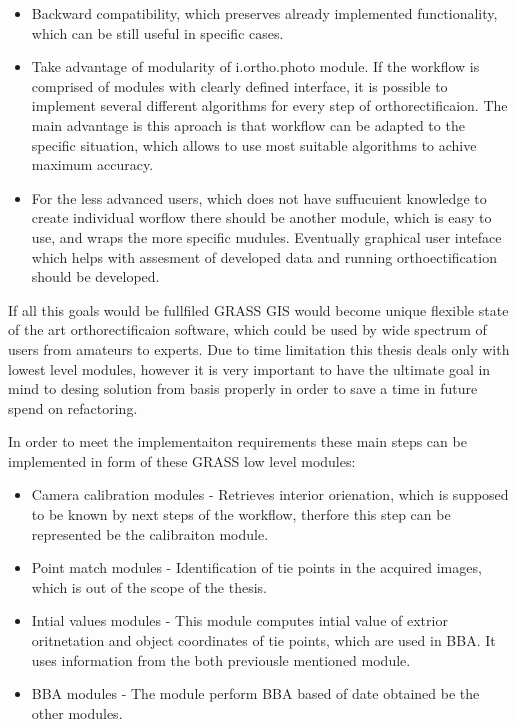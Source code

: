 \documentclass[a4paper,12pt]{report}
\begin{document}
\begin{itemize}
\begin{itemize}
\item Backward compatibility, which preserves already implemented functionality, which
can be still useful in specific cases. 
\item Take advantage of modularity of i.ortho.photo module.
If the workflow is comprised of modules with clearly defined interface, it is possible to implement
several different algorithms for every step of orthorectificaion. The main advantage is this 
aproach is that workflow can be adapted to the specific situation, which allows to use 
most suitable algorithms to achive maximum accuracy.
\item For the less advanced users, which does not have suffucuient knowledge to create individual 
worflow there should be another module, which is easy to use, and wraps the more specific mudules.
Eventually graphical user inteface which helps with assesment of developed data and running orthoectification
should be developed. 
\end{itemize}

If all this goals would be fullfiled GRASS GIS would become unique flexible state of the art orthorectificaion 
software, which could be used by wide spectrum of users from amateurs to experts.
Due to time limitation this thesis deals only with lowest level modules, however it is very important to have 
the ultimate goal in mind to desing solution from basis properly in order to save a time in future spend 
on refactoring.

In order to meet the implementaiton requirements these main steps can be implemented in form 
of these GRASS low level modules:

\begin{itemize}
\item Camera calibration modules - Retrieves interior orienation, which is supposed to be known by 
next steps of the workflow, therfore this step can be represented be the calibraiton module.
\item Point match modules - Identification of tie points in the acquired images, which is out of the 
scope of the thesis.
\item Intial values modules - This module computes intial value of extrior oritnetation and 
object coordinates of tie points, which are used in BBA. It uses information from the both
previousle mentioned module.
\item BBA modules - The module perform BBA based of date obtained be the other modules.
\end{itemize}



\end{itemize}
\end{document}
